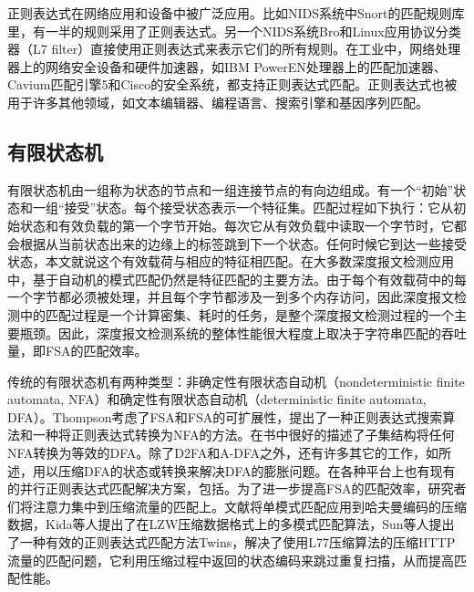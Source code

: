 正则表达式在网络应用和设备中被广泛应用。比如NIDS系统中Snort的匹配规则库里，有一半的规则采用了正则表达式。另一个NIDS系统Bro和Linux应用协议分类器（L7 filter）直接使用正则表达式来表示它们的所有规则。在工业中，网络处理器上的网络安全设备和硬件加速器，如IBM PowerEN处理器上的匹配加速器、Cavium匹配引擎5和Cisco的安全系统，都支持正则表达式匹配。正则表达式也被用于许多其他领域，如文本编辑器、编程语言、搜索引擎和基因序列匹配\cite{xu2016survey}。 

\vspace{3mm}
\subsection{有限状态机}
有限状态机由一组称为状态的节点和一组连接节点的有向边组成。有一个“初始”状态和一组“接受”状态。每个接受状态表示一个特征集。匹配过程如下执行：它从初始状态和有效负载的第一个字节开始。每次它从有效负载中读取一个字节时，它都会根据从当前状态出来的边缘上的标签跳到下一个状态。任何时候它到达一些接受状态，本文就说这个有效载荷与相应的特征相匹配。在大多数深度报文检测应用中，基于自动机的模式匹配仍然是特征匹配的主要方法。由于每个有效载荷中的每一个字节都必须被处理，并且每个字节都涉及一到多个内存访问，因此深度报文检测中的匹配过程是一个计算密集、耗时的任务，是整个深度报文检测过程的一个主要瓶颈。因此，深度报文检测系统的整体性能很大程度上取决于字符串匹配的吞吐量，即FSA的匹配效率。 

传统的有限状态机有两种类型：非确定性有限状态自动机（nondeterministic finite automata, NFA）和确定性有限状态自动机（deterministic finite automata, DFA）。Thompson\cite{thompson1968programming}考虑了FSA和FSA的可扩展性，提出了一种正则表达式搜索算法和一种将正则表达式转换为NFA的方法。在书\cite{hopcroft2001introduction}中很好的描述了子集结构将任何NFA转换为等效的DFA。除了D2FA和A-DFA之外，还有许多其它的工作，如\cite{smith2008xfa}\cite{ficara2008improved}\cite{yu2014revisiting}\cite{antonello2015design}\cite{yu20163}所述，用以压缩DFA的状态或转换来解决DFA的膨胀问题。在各种平台上也有现有的并行正则表达式匹配解决方案，包括\cite{yu2013gpu}\cite{fang2015fast}\cite{zhao2015fly}\cite{yu2017robotomata}。为了进一步提高FSA的匹配效率，研究者们将注意力集中到压缩流量的匹配上。文献\cite{klein2005pattern}\cite{shapira2006adapting}将单模式匹配应用到哈夫曼编码的压缩数据，Kida\cite{kida1998multiple}等人提出了在LZW压缩数据格式上的多模式匹配算法，Sun等人提出了一种有效的正则表达式匹配方法Twins\cite{sun2020efficient}，解决了使用L77压缩算法的压缩HTTP流量的匹配问题，它利用压缩过程中返回的状态编码来跳过重复扫描，从而提高匹配性能。 


\vspace{3mm}
